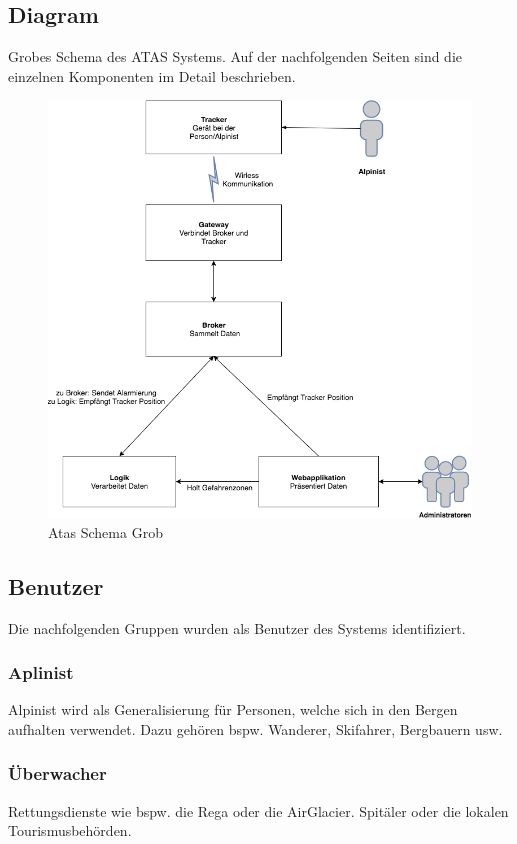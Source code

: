\documentclass[11pt,english,german]{report}
\theoremstyle{definition}
\begin{document}
\subsection{Diagram}
Grobes Schema des ATAS Systems. Auf der nachfolgenden Seiten sind die einzelnen Komponenten im Detail beschrieben.\\[0.3cm]
\begin{figure}[H]
	\centering
	\includegraphics[width=\textwidth]{img/system/ATAS_SystemOverview_Abstract_BA.png}
	\caption[Atas Schema Grob]
	{Atas Schema Grob}
\end{figure}

\newpage

\subsection{Benutzer}
Die nachfolgenden Gruppen wurden als Benutzer des Systems identifiziert.
\subsubsection{Aplinist}
Alpinist wird als Generalisierung für Personen, welche sich in den Bergen aufhalten verwendet. Dazu gehören bspw. Wanderer, Skifahrer, Bergbauern usw.
\subsubsection{Überwacher}
Rettungsdienste wie bspw. die Rega oder die AirGlacier. Spitäler oder die lokalen Tourismusbehörden.
\end{document}
